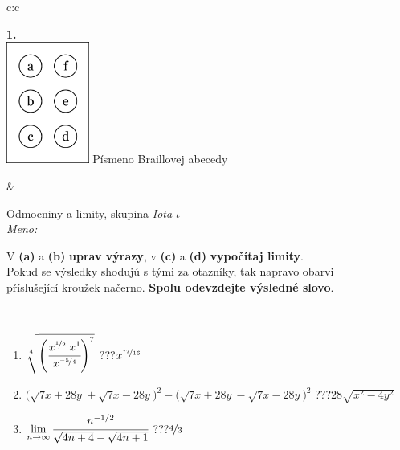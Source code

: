 \documentclass[10pt]{report}
\begin{document}
\begin{tabular}{c:c}
\begin{minipage}[c][104.5mm][t]{0.5\linewidth}
\begin{center}
\begin{minipage}{0.20\linewidth}
\begin{center}
{\Huge\bfseries 1.} \\[2mm]
\includegraphics[height=40mm]{../images/braille.png}
{\small Písmeno Braillovej abecedy}
\end{center}
\end{minipage}
\end{center}
\end{minipage}
&
\begin{minipage}[c][104.5mm][t]{0.5\linewidth}
\begin{center}
\vspace{7mm}
{\huge Odmocniny a limity, skupina \textit{Iota $\iota$} -}\\[5mm]
\textit{Meno:}\phantom{xxxxxxxxxxxxxxxxxxxxxxxxxxxxxxxxxxxxxxxxxxxxxxxxxxxxxxxxxxxxxxxxx}\\[5mm]
\begin{minipage}{0.95\linewidth}
\begin{center}
V \textbf{(a)} a \textbf{(b)} \textbf{uprav výrazy}, v \textbf{(c)} a \textbf{(d)} \textbf{vypočítaj limity}.\\Pokud se výsledky shodujú s tými za otazníky, tak napravo obarvi\\příslušející kroužek načerno. \textbf{Spolu odevzdejte výsledné slovo}.
\end{center}
\end{minipage}
\\[1mm]
\begin{minipage}{0.79\linewidth}
\begin{center}
\begin{varwidth}{\linewidth}
\begin{enumerate}
\small
\item $\sqrt[4]{\left(\cfrac{x^{\nicefrac{1}{2}}\;x^{1}}{x^{\nicefrac{-5}{4}}}\right)^{7}}$\quad \dotfill\; ???\;\dotfill \quad $x^{\nicefrac{77}{16}}$
\item {\footnotesize{\scriptsize$\big(\sqrt{7x+28y}+\sqrt{7x-28y}\big)^2-\big(\sqrt{7x+28y}-\sqrt{7x-28y}\big)^2$}\quad \dotfill\; ???\;\dotfill \quad $28\sqrt{x^2-4y^2}$}
\item $\lim\limits_{n\to\infty}\cfrac{n^{-1/2}}{\sqrt{4n+4}-\sqrt{4n+1}}$\quad \dotfill\; ???\;\dotfill \quad $\nicefrac{4}{3}$

\end{enumerate}
\end{varwidth}
\end{center}
\end{minipage}
\end{center}
\end{minipage}
\end{tabular}
\end{document}
